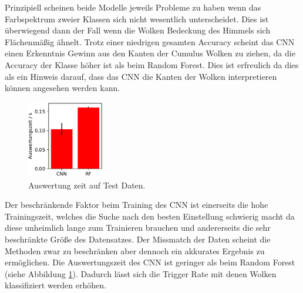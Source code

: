Prinzipiell scheinen beide Modelle jeweils Probleme zu haben wenn das 
Farbspektrum zweier Klassen sich nicht wesentlich unterscheidet.
Dies ist überwiegend dann der Fall wenn die Wolken Bedeckung des Himmels sich
Flächenmäßig ähnelt. 
Trotz einer niedrigen gesamten Accuracy scheint das CNN einen 
Erkenntnis Gewinn aus den Kanten der Cumulus Wolken zu ziehen, da die Accuracy
der Klasse höher ist als beim Random Forest.
Dies ist erfreulich da dies als ein Hinweis darauf, dass das CNN 
die Kanten der Wolken interpretieren können angesehen werden kann. 

\begin{figure}
		\centering
		\vspace{-0.4cm}
		\includegraphics[width=0.3\textwidth]{pictures/time.pdf}
		\caption{Auswertung zeit auf Test Daten.}
		\label{fig:time}
\end{figure}
Der beschränkende Faktor beim Training des CNN ist einerseits die hohe
Trainingszeit, welches die Suche nach den besten Einstellung schwierig macht da
diese unheimlich lange zum Trainieren brauchen und andererseits die sehr
beschränkte Größe des Datensatzes. 
Der Missmatch der Daten scheint die Methoden zwar zu beschränken aber dennoch
ein akkurates Ergebnis zu ermöglichen.
Die Auswertungszeit des CNN ist geringer als beim Random Forest (siehe Abbildung
\ref{fig:time}). 
Dadurch lässt sich die Trigger Rate mit denen Wolken klassifiziert werden
erhöhen.

